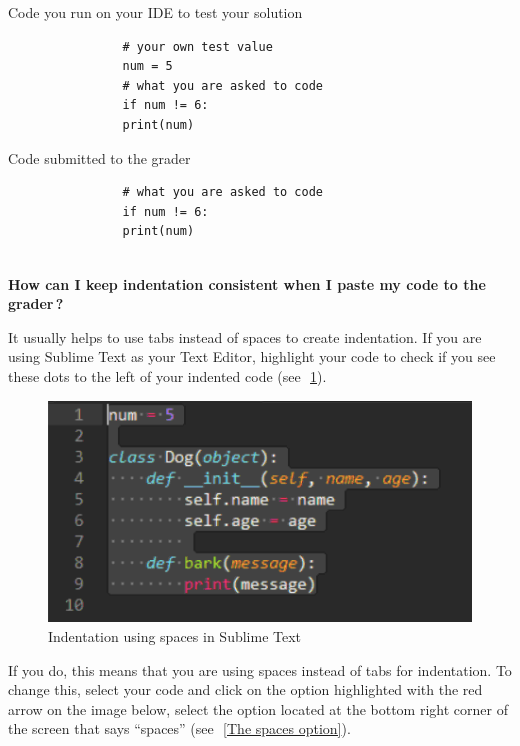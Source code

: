 \documentclass{article}
\newcommand{\question}[1]{\item[$\bullet$] 
	\begin{minipage}[t]{\textwidth}
		\bfseries#1
	\end{minipage}
	\hfil
}
\newenvironment{answer}{}{}
\newenvironment{faq}{\begin{description}}{\end{description}}
\begin{document}
\begin{faq}
\begin{answer}
			\begin{table}[htb]
				\caption{Code you run on your IDE to test your solution}
				\label{Code you run on your IDE to test your solution}
				\begin{verbatim}
				# your own test value
				num = 5
				# what you are asked to code
				if num != 6:
				print(num)  
				\end{verbatim}
			\end{table}
			
			\begin{table}[htb]
				\caption{Code submitted to the grader}
				\label{Code submitted to the grader}
				\begin{verbatim}
				# what you are asked to code
				if num != 6:
				print(num)
				
				\end{verbatim}
			\end{table}
		\end{answer}
		
		\question{How can I keep indentation consistent when I paste my code to the grader\,?}
		\begin{answer}
			It usually helps to use tabs instead of spaces to create indentation.
			If you are using Sublime Text as your Text Editor, highlight your code to check if you see
			these dots to the left of your indented code (see~\figurename\,\textcolor{blue}{\ref{Indentation using spaces in Sublime Text}}).
			
			\begin{figure}[htb]
				\centering
				\caption{Indentation using spaces in Sublime Text} \label{Indentation using spaces in Sublime Text}
				\includegraphics[scale=.5]{dots_indentation}
			\end{figure}
			
			If you do, this means that you are using spaces instead of tabs for
			indentation. To change this, select your code and click on the option highlighted with
			the red arrow on the image below, select the option located at the bottom right corner
			of the screen that says ``spaces'' (see~\figurename\,\textcolor{blue}{\ref{The spaces option}}).
			

\end{answer}
\end{faq}
\end{document}
